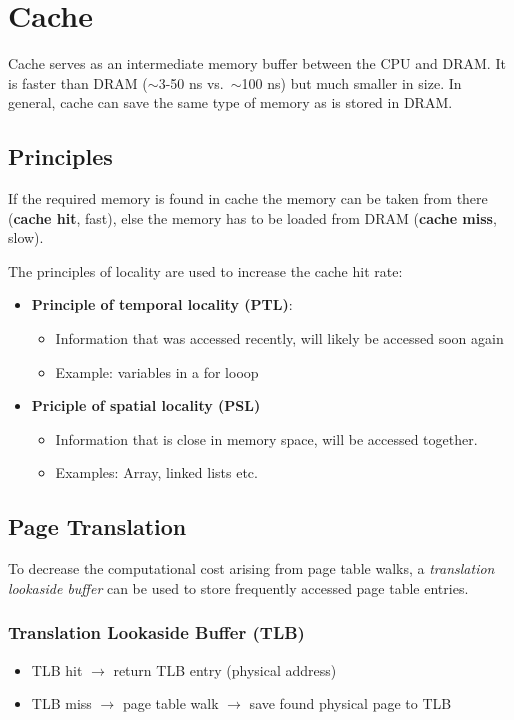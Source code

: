 \section{Cache}
Cache serves as an intermediate memory buffer between the CPU and DRAM. It is faster than DRAM ($\sim$3-50 ns vs.\ $\sim$100 ns) but much smaller in size.
In general, cache can save the same type of memory as is stored in DRAM.
\subsection{Principles}

If the required memory is found in cache the memory can be taken from there (\textbf{cache hit}, fast), else the memory has to be loaded from DRAM (\textbf{cache miss}, slow).

\newpar{}

The principles of locality are used to increase the cache hit rate:
\begin{itemize}
    \item \textbf{Principle of temporal locality (PTL)}:
          \begin{itemize}
              \item Information that was accessed recently, will likely be accessed soon again
              \item Example: variables in a for looop
          \end{itemize}
    \item \textbf{Priciple of spatial locality (PSL)}
          \begin{itemize}
              \item Information that is close in memory space, will be accessed together.
              \item Examples: Array, linked lists etc.\
          \end{itemize}
\end{itemize}

\subsection{Page Translation}
To decrease the computational cost arising from page table walks, a \textit{translation lookaside buffer} can be used to store frequently accessed page table entries.

\subsubsection{Translation Lookaside Buffer (TLB)}
\begin{itemize}
    \item TLB hit $\to$ return TLB entry (physical address)
    \item TLB miss $\to$ page table walk $\to$ save found physical page to TLB
\end{itemize}

